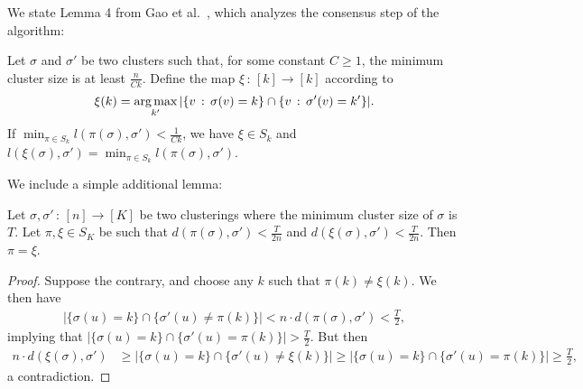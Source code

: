 \documentclass{article}
\begin{document}
We state Lemma 4 from Gao et al.~\cite{GaoEtal15}, which analyzes the consensus step of the algorithm:
\begin{lemma} 
\label{lem:consensus_analysis}
Let $\sigma$ and $\sigma'$ be two clusters such that, for some constant $C \geq 1$, the minimum cluster size is at least $ \frac{n}{Ck}$. Define the map $\xi \,:\, [k] \rightarrow [k]$ according to
\begin{equation*}
\xi(k) = \mathop{\text{\rm arg\,max}}_{k'} | \{ v \,:\, \sigma(v) = k \} \cap \{ v \,:\, \sigma'(v) = k' \} |.
\end{equation*}
If $\min_{\pi \in S_k} l(\pi(\sigma), \sigma') < \frac{1}{Ck}$, we have $\xi \in S_k$ and $l(\xi(\sigma), \sigma') = \min_{\pi \in S_k} l(\pi(\sigma), \sigma')$. 
\end{lemma}

We include a simple additional lemma:
\begin{lemma}
\label{lem:consensus_uniqueness}
Let $\sigma, \sigma' \,:\, [n] \rightarrow [K]$ be two clusterings where the minimum cluster size of $\sigma$ is $T$. Let $\pi, \xi \in S_K$ be such that $d(\pi(\sigma), \sigma') < \frac{T}{2n}$ and $d(\xi(\sigma), \sigma') < \frac{T}{2n}$. Then $\pi = \xi$.
\end{lemma}

\begin{proof}
Suppose the contrary, and choose any $k$ such that $\pi(k) \neq \xi(k)$. We then have
\begin{align*}
| \{ \sigma(u) = k \} \cap \{ \sigma'(u) \neq \pi(k) \} | < n \cdot d(\pi(\sigma), \sigma') < \frac{T}{2},
\end{align*}
implying that $| \{ \sigma(u) = k \} \cap \{ \sigma'(u) = \pi(k) \}| > \frac{T}{2}$. But then
\begin{align*}
n \cdot d(\xi(\sigma), \sigma') &\geq | \{ \sigma(u) = k \} \cap \{\sigma'(u) \neq \xi(k) \} | \geq | \{ \sigma(u) = k\} \cap \{ \sigma'(u) = \pi(k) \}| \geq \frac{T}{2},
\end{align*}
a contradiction.
\end{proof}

\end{document}
